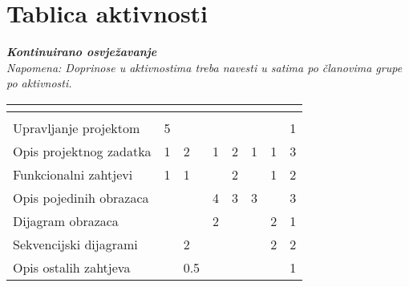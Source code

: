 		\eject
		\section*{Tablica aktivnosti}
		
			\textbf{\textit{Kontinuirano osvježavanje}}\\
			
			 \textit{Napomena: Doprinose u aktivnostima treba navesti u satima po članovima grupe po aktivnosti.}
					
						
			
			\begin{longtabu} to \textwidth {|X[7, l]|X[1, c]|X[1, c]|X[1, c]|X[1, c]|X[1, c]|X[1, c]|X[1, c]|}
								
				  &      &  &
				 &	 &	 &
				 &
				 \\ \hline 
				\endfirsthead
				
			
				  &      &  &
				 &	 &	 &
				 &
				 \\ \hline  
				\endhead
				
				
				\endfoot
							
				 
				\endlastfoot
				
				Upravljanje projektom 		&5  &  &  &  &  &  &1   \\ \hline
				Opis projektnog zadatka 	&1  &2  &1  &2  &1  &1  &3   \\ \hline
				
				Funkcionalni zahtjevi       &1  &1  &  &2  &  &1  &2    \\ \hline
				Opis pojedinih obrazaca 	&  &  &4  &3  &3  &  &3    \\ \hline
				Dijagram obrazaca 			&  &  &2  &  &  &2  &1    \\ \hline
				Sekvencijski dijagrami 		&  &2  &  &  &  &2  &2    \\ \hline
				Opis ostalih zahtjeva 		&  &0.5  &  &  &  &  &1    \\ \hline


\end{longtabu}
